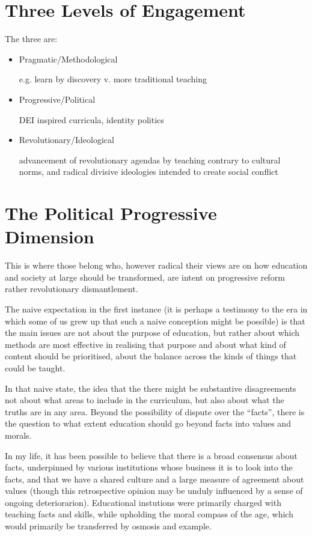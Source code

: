 \documentclass[10pt,titlepage]{article}
\begin{document}
\section{Three Levels of Engagement}

The three are:

\begin{itemize}
\item Pragmatic/Methodological

  e.g. learn by discovery v. more traditional teaching

\item Progressive/Political

DEI inspired curricula, identity politics
  
\item Revolutionary/Ideological

  advancement of revolutionary agendas by teaching contrary to cultural norms, and radical divisive ideologies intended to create social conflict
\end{itemize}

\section{The Political Progressive Dimension}

This is where those belong who, however radical their views are on how education and society at large should be transformed, are intent on progressive reform rather revolutionary dismantlement.

The naive expectation in the first instance (it is perhaps a testimony to the era in which some of us grew up that such a naive conception might be possible) is that the main issues are not about the purpose of education, but rather about which methods are most effective in realising that purpose and about what kind of content should be prioritised, about the balance across the kinds of things that could be taught.

In that naive state, the idea that the there might be substantive disagreements not about what areas to include in the curriculum, but also about what the truths are in any area.
Beyond the possibility of dispute over the ``facts'', there is the question to what extent education should go beyond facts into values and morals.

In my life, it has been possible to believe that there is a broad consensus about facts, underpinned by various institutions whose business it is to look into the facts, and that we have a shared culture and a large measure of agreement about values (though this retrospective opinion may be unduly influenced by a sense of ongoing deteriorarion).
Educational instutions were primarily charged with teaching facts and skills, while upholding the moral compass of the age, which would primarily be transferred by osmosis and example.
\end{document}
